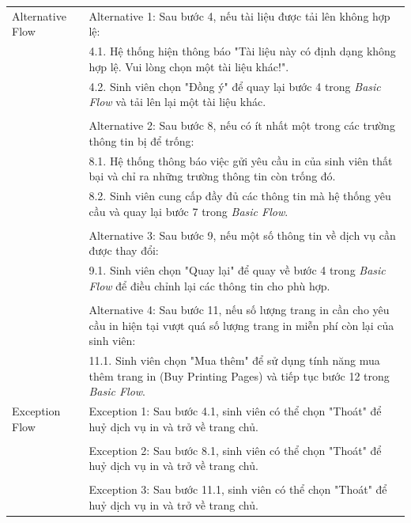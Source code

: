 \begin{enumerate}[a)]
\begin{longtable}{|l|p{10cm}|}
        \hline
        Alternative Flow & Alternative 1: Sau bước 4,  nếu tài liệu được tải lên không hợp lệ:\\
        & \hspace{1em} 4.1. Hệ thống hiện thông báo "Tài liệu này có định dạng không hợp lệ. Vui lòng chọn một tài liệu khác!".\\
        & \hspace{1em} 4.2. Sinh viên chọn "Đồng ý" để quay lại bước 4 trong \textit{Basic Flow} và tải lên lại một tài liệu khác.\\
        &\\
        & Alternative 2: Sau bước 8, nếu có ít nhất một trong các trường thông tin bị để trống:\\
        & \hspace{1em} 8.1. Hệ thống thông báo việc gửi yêu cầu in của sinh viên thất bại và chỉ ra những trường thông tin còn trống đó.\\
        & \hspace{1em} 8.2. Sinh viên cung cấp đầy đủ các thông tin mà hệ thống yêu cầu và quay lại bước 7 trong \textit{Basic Flow}.\\
         &\\
        & Alternative 3: Sau bước 9, nếu một số thông tin về dịch vụ cần được thay đổi:\\
        & \hspace{1em} 9.1. Sinh viên chọn "Quay lại" để quay về bước 4 trong \textit{Basic Flow} để điều chỉnh lại các thông tin cho phù hợp.\\
        &\\
        & Alternative 4: Sau bước 11, nếu số lượng trang in cần cho yêu cầu in hiện tại vượt quá số lượng trang in miễn phí còn lại của sinh viên:\\
        & \hspace{1em} 11.1. Sinh viên chọn "Mua thêm" để sử dụng tính năng mua thêm trang in (Buy Printing Pages) và tiếp tục bước 12 trong \textit{Basic Flow}.\\
        \hline
        Exception Flow & Exception 1: Sau bước 4.1, sinh viên có thể chọn "Thoát" để huỷ dịch vụ in và trở về trang chủ.\\
        &\\
        & Exception 2: Sau bước 8.1, sinh viên có thể chọn "Thoát" để huỷ dịch vụ in và trở về trang chủ.\\
        &\\
        & Exception 3: Sau bước 11.1, sinh viên có thể chọn "Thoát" để huỷ dịch vụ in và trở về trang chủ.\\
    \end{longtable}


\end{enumerate}
